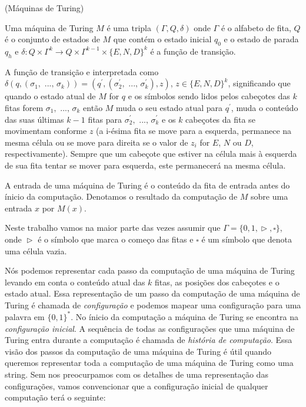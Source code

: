 \begin{defi}(Máquinas de Turing) \label{defi:MT}

Uma máquina de Turing $M$ é uma tripla $(\Gamma, Q, \delta)$ onde $\Gamma$ é o alfabeto de fita, $Q$ é o conjunto de estados de $M$ que contém o estado inicial $q_{0}$ e o estado de parada $q_{h}$ e $\delta: Q \times \Gamma^{k} \to Q \times \Gamma^{k - 1} \times \{E, N, D\}^{k}$ é a função de transição.

A função de transição e interpretada como $\delta(q, (\sigma_{1}, \text{ ..., } \sigma_{k})) = (q^{\prime}, (\sigma_{2}^{\prime}, \text{ ..., } \sigma_{k}^{\prime}), z)$, $z \in \{E, N, D\}^{k}$, significando que quando o estado atual de $M$ for $q$ e os símbolos sendo lidos pelos cabeçotes das $k$ fitas forem $\sigma_{1}, \text{ ..., } \sigma_{k}$ então $M$ muda o seu estado atual para $q^{\prime}$, muda o conteúdo das suas últimas $k - 1$ fitas para $\sigma_{2}^{\prime}, \text{ ..., } \sigma_{k}^{\prime}$ e os $k$ cabeçotes da fita se movimentam conforme $z$ (a i-ésima fita se move para a esquerda, permanece na mesma célula ou se move para direita se o valor de $z_{i}$ for $E$, $N$ ou $D$, respectivamente). Sempre que um cabeçote que estiver na célula mais à esquerda de sua fita tentar se mover para esquerda, este permanecerá na mesma célula.

A entrada de uma máquina de Turing é o conteúdo da fita de entrada antes do ínicio da computação. Denotamos o resultado da computação de $M$ sobre uma entrada $x$ por $M(x)$.

\end{defi}

Neste trabalho vamos na maior parte das vezes assumir que $\Gamma = \{0, 1, \vartriangleright, \square\}$, onde $\vartriangleright$ é o símbolo que marca o começo das fitas e $\square$ é um símbolo que denota uma célula vazia.

Nós podemos representar cada passo da computação de uma máquina de Turing levando em conta o conteúdo atual das $k$ fitas, as posições dos cabeçotes e o estado atual. Essa representação de um passo da computação de uma máquina de Turing é chamada de \emph{configuração} e podemos mapear uma configuração para uma palavra em $\{0, 1\}^{*}$. No ínicio da computação a máquina de Turing se encontra na \emph{configuração inicial}. A sequência de todas as configurações que uma máquina de Turing entra durante a computação é chamada de \emph{história de computação}. Essa visão dos passos da computação de uma máquina de Turing é útil quando queremos representar toda a computação de uma máquina de Turing como uma string. Sem nos preocurpamos com os detalhes de uma representação das configurações, vamos convencionar que a configuração inicial de qualquer computação terá o seguinte:


